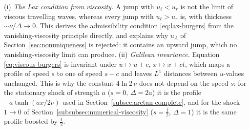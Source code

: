 \begin{remark}
(i) \emph{The Lax condition from viscosity.} A jump with $u_\ell<u_r$ is not
the limit of viscous travelling waves, whereas every jump with $u_\ell>u_r$ is,
with thickness $\sim\nu/\Delta\to0$. This derives the admissibility condition
\eqref{eq:lax-burgers} from the vanishing-viscosity principle directly, and
explains why $u_A$ of Section~\ref{sec:nonuniqueness} is rejected: it contains
an upward jump, which no vanishing-viscosity limit can produce.
(ii) \emph{Galilean invariance.} Equation \eqref{eq:viscous-burgers} is
invariant under $u\mapsto u+c$, $x\mapsto x+ct$, which maps a profile of
speed $s$ to one of speed $s-c$ and leaves $L^1$ distances between $u$-values
unchanged. This is why the constant $4\ln2\,\nu$ does not depend on the speed
$s$: for the stationary shock of strength $a$ ($s=0$, $\Delta=2a$) it is the
profile $-a\tanh(ax/2\nu)$ used in Section~\ref{subsec:arctan-complete}, and
for the shock $1\to0$ of Section~\ref{subsubsec:numerical-viscosity}
($s=\tfrac12$, $\Delta=1$) it is the same profile boosted by $\tfrac12$.
\end{remark}
